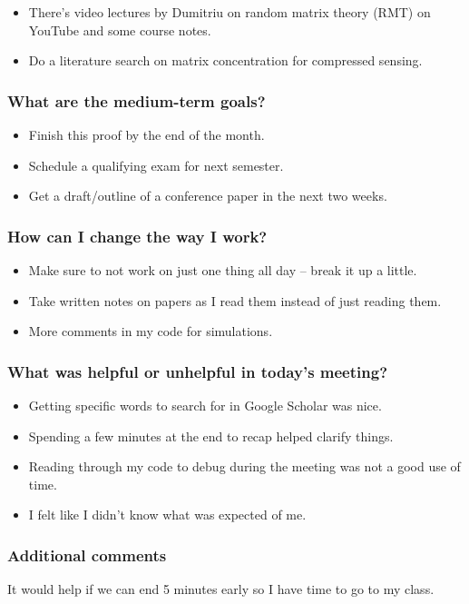 \documentclass[10pt, letter]{article}
\begin{document}
\begin{note}
\begin{itemize}
\item There's video lectures by Dumitriu on random matrix theory (RMT) on YouTube and some course notes.
\item Do a literature search on matrix concentration for compressed sensing.
\end{itemize}
\end{note}

\subsubsection*{What are the medium-term goals?}  

\begin{note}
\begin{itemize}
\item Finish this proof by the end of the month.
\item Schedule a qualifying exam for next semester.
\item Get a draft/outline of a conference paper in the next two weeks.
\end{itemize}
\end{note}

\subsubsection*{How can I change the way I work?}

\begin{note}
\begin{itemize}
\item Make sure to not work on just one thing all day -- break it up a little.
\item Take written notes on papers as I read them instead of just reading them.
\item More comments in my code for simulations.
\end{itemize}
\end{note}

\subsubsection*{What was helpful or unhelpful in today's meeting?}

\begin{note}
\begin{itemize}
\item Getting specific words to search for in Google Scholar was nice.
\item Spending a few minutes at the end to recap helped clarify things.
\item Reading through my code to debug during the meeting was not a good use of time.
\item I felt like I didn't know what was expected of me.
\end{itemize}
\end{note}


\subsubsection*{Additional comments}

\begin{note}
It would help if we can end 5 minutes early so I have time to go to my class.
\end{note}
\end{document}
